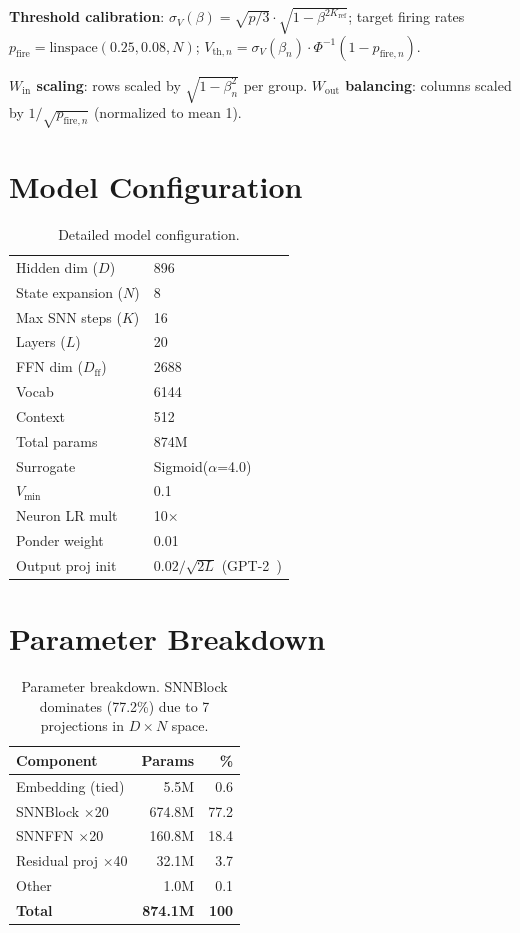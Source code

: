 \documentclass{article}
\newcommand{\vmin}{V_{\text{min}}}
\begin{document}
\textbf{Threshold calibration}: $\sigma_V(\beta) = \sqrt{p/3} \cdot \sqrt{1 - \beta^{2K_{\text{ref}}}}$; target firing rates $p_{\text{fire}} = \text{linspace}(0.25, 0.08, N)$; $V_{\text{th},n} = \sigma_V(\beta_n) \cdot \Phi^{-1}(1 - p_{\text{fire},n})$.

\textbf{$W_{\text{in}}$ scaling}: rows scaled by $\sqrt{1 - \beta_n^2}$ per group.
\textbf{$W_{\text{out}}$ balancing}: columns scaled by $1/\sqrt{p_{\text{fire},n}}$ (normalized to mean 1).

\section{Model Configuration}
\label{app:config}

\begin{table}[H]
\centering
\small
\caption{Detailed model configuration.}
\begin{tabular}{ll}
\toprule
Hidden dim ($D$) & 896 \\ State expansion ($N$) & 8 \\ Max SNN steps ($K$) & 16 \\
Layers ($L$) & 20 \\ FFN dim ($D_{\text{ff}}$) & 2688 \\ Vocab & 6144 \\ Context & 512 \\
Total params & 874M \\
\midrule
Surrogate & Sigmoid($\alpha$=4.0) \\ $\vmin$ & 0.1 \\ Neuron LR mult & 10$\times$ \\ Ponder weight & 0.01 \\
Output proj init & $0.02/\sqrt{2L}$ (GPT-2~\citep{radford2019language}) \\
\bottomrule
\end{tabular}
\end{table}

\section{Parameter Breakdown}
\label{app:params}

\begin{table}[H]
\centering
\small
\caption{Parameter breakdown. SNNBlock dominates (77.2\%) due to 7 projections in $D{\times}N$ space.}
\begin{tabular}{lrr}
\toprule
\textbf{Component} & \textbf{Params} & \textbf{\%} \\
\midrule
Embedding (tied) & 5.5M & 0.6 \\
SNNBlock $\times$20 & 674.8M & 77.2 \\
SNNFFN $\times$20 & 160.8M & 18.4 \\
Residual proj $\times$40 & 32.1M & 3.7 \\
Other & 1.0M & 0.1 \\
\midrule
\textbf{Total} & \textbf{874.1M} & \textbf{100} \\
\bottomrule
\end{tabular}
\end{table}
\end{document}
